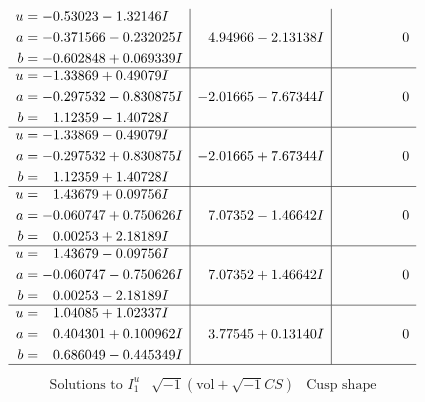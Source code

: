 \documentclass[1p]{elsarticle_modified}
\theoremstyle{definition}
\newcommand{\I}{\sqrt{-1}}
\begin{document}
$$\begin{array}{c|c|c}
\begin{aligned}
u &= -0.53023 - 1.32146 I \\
a &= -0.371566 - 0.232025 I \\
b &= -0.602848 + 0.069339 I\end{aligned}
 & \phantom{-}4.94966 - 2.13138 I & \phantom{-0.000000 } 0 \\ \hline\begin{aligned}
u &= -1.33869 + 0.49079 I \\
a &= -0.297532 - 0.830875 I \\
b &= \phantom{-}1.12359 - 1.40728 I\end{aligned}
 & -2.01665 - 7.67344 I & \phantom{-0.000000 } 0 \\ \hline\begin{aligned}
u &= -1.33869 - 0.49079 I \\
a &= -0.297532 + 0.830875 I \\
b &= \phantom{-}1.12359 + 1.40728 I\end{aligned}
 & -2.01665 + 7.67344 I & \phantom{-0.000000 } 0 \\ \hline\begin{aligned}
u &= \phantom{-}1.43679 + 0.09756 I \\
a &= -0.060747 + 0.750626 I \\
b &= \phantom{-}0.00253 + 2.18189 I\end{aligned}
 & \phantom{-}7.07352 - 1.46642 I & \phantom{-0.000000 } 0 \\ \hline\begin{aligned}
u &= \phantom{-}1.43679 - 0.09756 I \\
a &= -0.060747 - 0.750626 I \\
b &= \phantom{-}0.00253 - 2.18189 I\end{aligned}
 & \phantom{-}7.07352 + 1.46642 I & \phantom{-0.000000 } 0 \\ \hline\begin{aligned}
u &= \phantom{-}1.04085 + 1.02337 I \\
a &= \phantom{-}0.404301 + 0.100962 I \\
b &= \phantom{-}0.686049 - 0.445349 I\end{aligned}
 & \phantom{-}3.77545 + 0.13140 I & \phantom{-0.000000 } 0\\
 \hline 
 \end{array}$$\newpage$$\begin{array}{c|c|c}  
\text{Solutions to }I^u_{1}& \I (\text{vol} + \sqrt{-1}CS) & \text{Cusp shape}\\
 \hline 
\begin{aligned}

\end{aligned}
\end{array}$$
\end{document}
